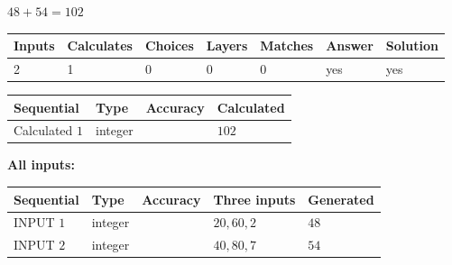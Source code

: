 \documentclass[12pt]{article}
\begin{document}
 
\noindent{}
 
 

$ %
48 +  %
54=   %
102$
 
 
\noindent{}
 
 

 
   
   
   
   
\noindent\begin{tabular}{|l|l|l|l|l|l|l|}
 \hline
Inputs & Calculates & Choices & Layers & Matches & Answer & Solution \\ \hline
 2  & 
 1  & 
 0
  & 
 0  & 
 0  & 
  yes & 
  yes 
  \\ \hline
 \end{tabular}
   
   
   
   
\noindent{}
   
   
  
  
\noindent\begin{tabular}{|l|l|l|l|}
\hline
 Sequential & Type & Accuracy & Calculated \\ 
\hline
 
 
  Calculated $  1 $ & integer &  & 
  $ 102 $ 
 \\  \hline  
 \end{tabular}
   
   
   
   
\noindent\vspace{0.1in}\hspace{-0.08in} {\textbf{\Large{All inputs: }}}
   
   
  
  
\noindent\begin{tabular}{|l|l|l|l|l|}
\hline
 Sequential & Type & Accuracy & Three inputs & Generated \\ 
\hline
 
 
  INPUT $  1 $ & integer &  & $
 20
 , 
 60
 , 
 2
 $ & $ 48 $ 
 \\  \hline  
 
 
  INPUT $  2 $ & integer &  & $
 40
 , 
 80
 , 
 7
 $ & $ 54 $ 
 \\  \hline  
 \end{tabular}
   
   
  
\end{document}
